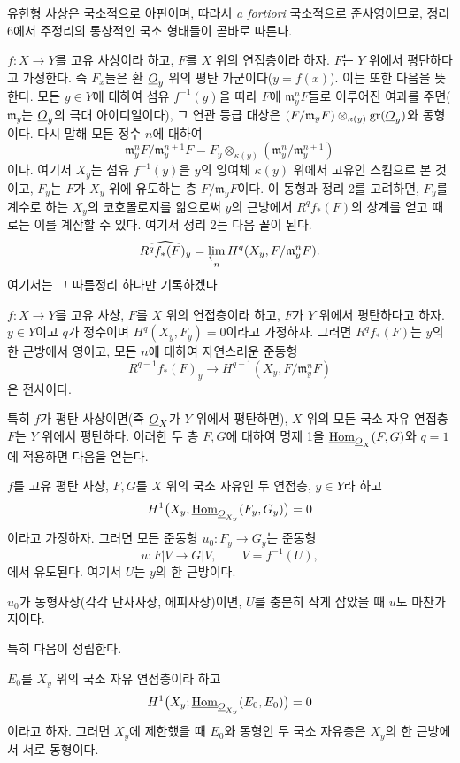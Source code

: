 유한형 사상은 국소적으로 아핀이며, 따라서 \textit{a fortiori}
국소적으로 준사영이므로, 정리 6에서 주정리의 통상적인 국소 형태들이
곧바로 따른다.

$f:X\longrightarrow Y$를 고유 사상이라 하고, $F$를 $X$ 위의 연접층이라
하자. $F$는 $Y$ 위에서 평탄하다고 가정한다. 즉 $F_x$들은 환
$\underline{O}_y$ 위의 평탄 가군이다($y=f(x)$). 이는 또한 다음을 뜻한다. 모든
$y\in Y$에 대하여 섬유 $f^{-1}(y)$을 따라 $F$에
$\mathfrak m_y^nF$들로 이루어진 여과를 주면($\mathfrak m_y$는
$\underline{O}_y$의 극대 아이디얼이다), 그 연관 등급 대상은
$(F/\mathfrak m_yF)\otimes_{\kappa(y)}\operatorname{gr}(\underline{O}_y)$와
동형이다. 다시 말해 모든 정수 $n$에 대하여
\[
  \mathfrak m_y^nF/\mathfrak m_y^{n+1}F
  =F_y\otimes_{\kappa(y)}
  (\mathfrak m_y^n/\mathfrak m_y^{n+1})
\]
이다. 여기서 $X_y$는 섬유 $f^{-1}(y)$을 $y$의 잉여체 $\kappa(y)$
위에서 고유인 스킴으로 본 것이고, $F_y$는 $F$가 $X_y$ 위에 유도하는
층 $F/\mathfrak m_yF$이다. 이 동형과 정리 2를 고려하면, $F_y$를
계수로 하는 $X_y$의 코호몰로지를 앎으로써 $y$의 근방에서
$R^qf_*(F)$의 상계를 얻고 때로는 이를 계산할 수 있다. 여기서 정리 2는
다음 꼴이 된다.
\[
  \widehat{R^qf_*(F)_y}
  =\varprojlim_n H^q(X_y,F/\mathfrak m_y^nF).
\]
여기서는 그 따름정리 하나만 기록하겠다.

 $f:X\longrightarrow Y$를 고유 사상, $F$를 $X$ 위의
연접층이라 하고, $F$가 $Y$ 위에서 평탄하다고 하자. $y\in Y$이고 $q$가
정수이며 $H^q(X_y,F_y)=0$이라고 가정하자. 그러면 $R^qf_*(F)$는 $y$의
한 근방에서 영이고, 모든 $n$에 대하여 자연스러운 준동형
\[
  R^{q-1}f_*(F)_y\longrightarrow
  H^{q-1}(X_y,F/\mathfrak m_y^nF)
\]
은 전사이다.

특히 $f$가 평탄 사상이면(즉 $\underline{O}_X$가 $Y$ 위에서 평탄하면), $X$ 위의
모든 국소 자유 연접층 $F$는 $Y$ 위에서 평탄하다. 이러한 두 층 $F,G$에
대하여 명제 1을 $\underline{\operatorname{Hom}}_{\underline{O}_X}(F,G)$와 $q=1$에 적용하면 다음을 얻는다.

 $f$를 고유 평탄 사상, $F,G$를 $X$ 위의 국소 자유인 두
연접층, $y\in Y$라 하고
\[
  H^1\bigl(X_y,\underline{\operatorname{Hom}}_{\underline{O}_{X_y}}(F_y,G_y)\bigr)=0
\]
이라고 가정하자. 그러면 모든 준동형 $u_0:F_y\longrightarrow G_y$는
준동형
\[
  u:F|V\longrightarrow G|V,
  \qquad V=f^{-1}(U),
\]
에서 유도된다. 여기서 $U$는 $y$의 한 근방이다.

 $u_0$가 동형사상(각각 단사사상, 에피사상)이면,
$U$를 충분히 작게 잡았을 때 $u$도 마찬가지이다.

특히 다음이 성립한다.

 $E_0$를 $X_y$ 위의 국소 자유 연접층이라 하고
\[
  H^1\bigl(X_y;\underline{\operatorname{Hom}}_{\underline{O}_{X_y}}(E_0,E_0)\bigr)=0
\]
이라고 하자. 그러면 $X_y$에 제한했을 때 $E_0$와 동형인 두 국소
자유층은 $X_y$의 한 근방에서 서로 동형이다.

